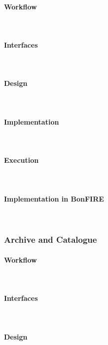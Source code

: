 \paragraph{Workflow}~\\

\paragraph{Interfaces}~\\

\paragraph{Design}~\\


\paragraph{Implementation}~\\

\paragraph{Execution}~\\

\paragraph{Implementation in BonFIRE}~\\



\subsubsection{Archive and Catalogue}

\paragraph{Workflow}~\\

\paragraph{Interfaces}~\\

\paragraph{Design}~\\


